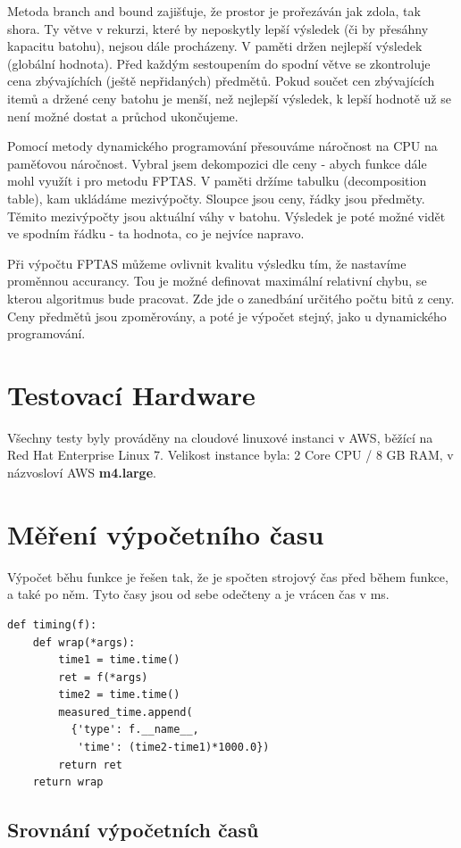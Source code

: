 \documentclass[a4paper,10pt,twocolumn]{article}
\begin{document}
Metoda branch and bound zajišťuje, že prostor je prořezáván jak zdola, tak shora. Ty větve v rekurzi, které by neposkytly lepší výsledek (či by přesáhny kapacitu batohu), nejsou dále procházeny. V paměti držen nejlepší výsledek (globální hodnota). Před každým sestoupením do spodní větve se zkontroluje cena zbývajíchích (ještě nepřidaných) předmětů. Pokud součet cen zbývajících itemů a držené ceny batohu je menší, než nejlepší výsledek, k lepší hodnotě už se není možné dostat a průchod ukončujeme.

Pomocí metody dynamického programování přesouváme náročnost na CPU na paměťovou náročnost. Vybral jsem dekompozici dle ceny - abych funkce dále mohl využít i pro metodu FPTAS. V paměti držíme tabulku (decomposition table), kam ukládáme mezivýpočty. Sloupce jsou ceny, řádky jsou předměty. Těmito mezivýpočty jsou aktuální váhy v batohu. Výsledek je poté možné vidět ve spodním řádku - ta hodnota, co je nejvíce napravo.

Při výpočtu FPTAS můžeme ovlivnit kvalitu výsledku tím, že nastavíme proměnnou accurancy. Tou je možné definovat maximální relativní chybu, se kterou algoritmus bude pracovat. Zde jde o zanedbání určitého počtu bitů z ceny. Ceny předmětů jsou zpoměrovány, a poté je výpočet stejný, jako u dynamického programování.


\section{Testovací Hardware}
Všechny testy byly prováděny na cloudové linuxové instanci v AWS, běžící na Red Hat Enterprise Linux 7. Velikost instance byla:
  2 Core CPU / 8 GB RAM, v názvosloví AWS \textbf{m4.large}.


\section{Měření výpočetního času}
Výpočet běhu funkce je řešen tak, že je spočten strojový čas před během funkce, a také po něm. Tyto časy jsou od sebe odečteny a je vrácen čas v ms.

   \begin{verbatim}
def timing(f):
    def wrap(*args):
        time1 = time.time()
        ret = f(*args)
        time2 = time.time()
        measured_time.append(
          {'type': f.__name__,
           'time': (time2-time1)*1000.0})
        return ret
    return wrap
   \end{verbatim}


\subsection{Srovnání výpočetních časů}
\end{document}
